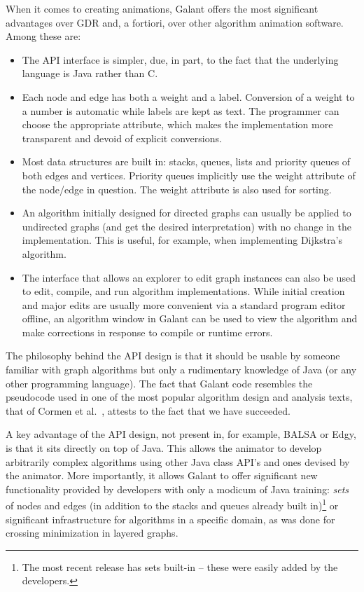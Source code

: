 When it comes
to creating animations,
Galant offers the most significant advantages over GDR and, a fortiori,
over other algorithm animation software. Among these are:

\begin{itemize}

\item
  The API interface is simpler, due, in part, to the fact that the
  underlying language is Java rather than C.

\item
  Each node and edge has both a weight and a label. Conversion of a weight to
  a number is automatic while labels are kept as text. The programmer can
  choose the appropriate attribute, which makes the implementation more
  transparent and devoid of explicit conversions.

\item
  Most data structures are built in: stacks, queues, lists and priority
  queues of both edges and vertices. Priority queues implicitly use the
  weight attribute of the node/edge in question. The weight attribute is also
  used for sorting.

\item
  An algorithm initially designed for directed graphs can usually be applied
  to undirected graphs (and get the desired interpretation) with no change in
  the implementation.
  This is useful, for example, when implementing Dijkstra's
  algorithm.

\item
  The interface that allows an explorer to edit graph instances can also be used
  to edit, compile, and run algorithm implementations. While initial creation
  and major edits are usually more convenient via a standard program editor
  offline, an algorithm window in Galant can be used to view the algorithm and
  make corrections in response to compile or runtime errors.

\end{itemize}

The philosophy behind the API design is that it should be usable by someone
familiar with graph algorithms but only a rudimentary knowledge of Java (or
any other programming language).
The fact that Galant code resembles the pseudocode used
in one of the most
popular algorithm design and analysis texts, that of Cormen et al.~\cite{2009-Intro_to_Algorithms-Cormen},
attests to the fact that we have succeeded.

A key advantage of the API design, not present in, for example, BALSA or Edgy,
is that it sits directly on top of Java.
This allows the animator to develop arbitrarily complex algorithms using other Java class API's and ones devised by the animator.
More importantly, it allows Galant to offer significant new functionality
provided by developers with only a modicum of Java training:
\emph{sets} of nodes and edges (in addition to the stacks and queues already
built in)\footnote{
  The most recent release has sets built-in -- these were easily added by the
  developers.
}
or significant infrastructure for algorithms in a specific domain,
as was done for crossing minimization in layered graphs.
